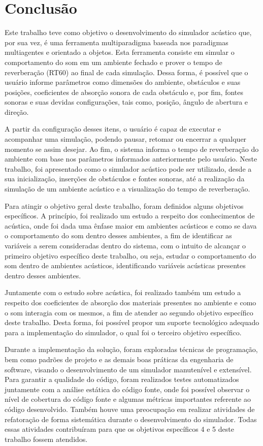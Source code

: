 \chapter{Conclusão}

Este trabalho teve como objetivo o desenvolvimento do simulador acústico que, por sua vez, é uma ferramenta multiparadigma baseada nos paradigmas multiagentes e orientado a objetos. Esta ferramenta consiste em simular o comportamento do som em um ambiente fechado e prover o tempo de reverberação (RT60) ao final de cada simulação. Dessa forma, é possível que o usuário informe parâmetros como dimensões do ambiente, obstáculos e suas posições, coeficientes de absorção sonora de cada obstáculo e, por fim, fontes sonoras e suas devidas configurações, tais como, posição, ângulo de abertura e direção. 

A partir da configuração desses itens, o usuário é capaz de executar e acompanhar uma simulação, podendo pausar, retomar ou encerrar a qualquer momento se assim desejar. Ao fim, o sistema informa o tempo de reverberação do ambiente com base nos parâmetros informados anteriormente pelo usuário. Neste trabalho, foi apresentado como o simulador acústico pode ser utilizado, desde a sua inicialização, inserções de obstáculos e fontes sonoras, até a realização da simulação de um ambiente acústico e a visualização do tempo de reverberação.

Para atingir o objetivo geral deste trabalho, foram definidos alguns objetivos específicos. A princípio, foi realizado um estudo a respeito dos conhecimentos de acústica, onde foi dada uma ênfase maior em ambientes acústicos e como se dava o comportamento do som dentro desses ambientes, a fim de identificar as variáveis a serem consideradas dentro do sistema, com o intuito de alcançar o primeiro objetivo específico deste trabalho, ou seja, estudar o comportamento do som dentro de ambientes acústicos, identificando variáveis acústicas presentes dentro desses ambientes.

Juntamente com o estudo sobre acústica, foi realizado também um estudo a respeito dos coeficientes de absorção dos materiais presentes no ambiente e como o som interagia com os mesmos, a fim de atender ao segundo objetivo específico deste trabalho. Desta forma, foi possível propor um suporte tecnológico adequado para a implementação do simulador, o qual foi o terceiro objetivo específico.

Durante a implementação da solução, foram exploradas técnicas de programação, bem como padrões de projeto e as demais boas práticas da engenharia de software, visando o desenvolvimento de um simulador manutenível e extensível. Para garantir a qualidade do código, foram realizados testes automatizados juntamente com a análise estática do código fonte, onde foi possível observar o nível de cobertura do código fonte e algumas métricas importantes referente ao código desenvolvido. Também houve uma preocupação em realizar atividades de refatoração de forma sistemática durante o desenvolvimento do simulador. Todas essas atividades contribuíram para que os objetivos específicos 4 e 5 deste trabalho fossem atendidos.


